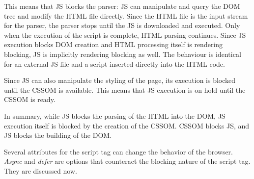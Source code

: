 This means that JS blocks the parser: JS can manipulate and query the DOM tree and modify the HTML file directly.
Since the HTML file is the input stream for the parser, the parser stops until the JS is downloaded and executed. %
Only when the execution of the script is complete, HTML parsing continues.
Since JS execution blocks DOM creation and HTML processing itself is rendering blocking, JS is implicitly rendering blocking as well. %
The behaviour is identical for an external JS file and a script inserted directly into the HTML code.









Since JS can also manipulate the styling of the page, its execution is blocked until the CSSOM is available.
This means that JS execution is on hold until the CSSOM is ready.

In summary, while JS blocks the parsing of the HTML into the DOM, JS execution itself is blocked by the creation of the CSSOM.
CSSOM blocks JS, and JS blocks the building of the DOM. %

Several attributes for the script tag can change the behavior of the browser.
\textit{Async} and \textit{defer} are options that counteract the blocking nature of the script tag.
They are discussed now. \\



